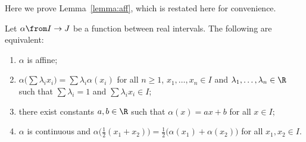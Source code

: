 Here we prove Lemma~\ref{lemma:aff}, which is restated here for convenience.

\begin{lemmaaff}
Let $\alpha \from I \to J$ be a function between real intervals.  The
following are equivalent:
% 
\begin{enumerate}
\item
$\alpha$ is affine;

\item
$\alpha\bigl( \sum \lambda_i x_i \bigr) = \sum \lambda_i \alpha(x_i)$ for
all $n \geq 1$, $x_1, \ldots, x_n \in I$ and $\lambda_1, \ldots,
\lambda_n \in \R$ such that $\sum \lambda_i = 1$ and $\sum \lambda_i x_i
\in I$;

\item 
there exist constants $a, b \in \R$ such that $\alpha(x) = ax + b$ for all
$x \in I$; 

\item
$\alpha$ is continuous and $\alpha\bigl(\tfrac{1}{2}(x_1 + x_2)\bigr) =
\tfrac{1}{2}\bigl(\alpha(x_1) + \alpha(x_2)\bigr)$ for all $x_1, x_2 \in I$.
\end{enumerate}
\end{lemmaaff}


